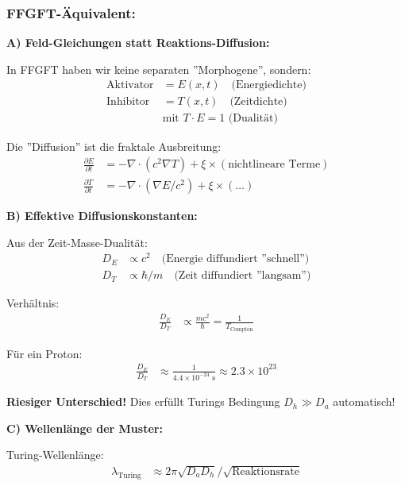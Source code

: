 	\subsubsection*{FFGFT-Äquivalent:}
	
	\textbf{A) Feld-Gleichungen statt Reaktions-Diffusion:}
	
	In FFGFT haben wir keine separaten ''Morphogene'', sondern:
	\begin{align*}
		\text{Aktivator} &= E(x,t) \quad \text{(Energiedichte)} \\
		\text{Inhibitor} &= T(x,t) \quad \text{(Zeitdichte)} \\
		&\text{mit } T \cdot E = 1 \text{ (Dualität)}
	\end{align*}
	
	Die ''Diffusion'' ist die fraktale Ausbreitung:
	\begin{align*}
		\frac{\partial E}{\partial t} &= -\nabla \cdot (c^2 \nabla T) + \xi \times (\text{nichtlineare Terme}) \\
		\frac{\partial T}{\partial t} &= -\nabla \cdot (\nabla E/c^2) + \xi \times (\dots)
	\end{align*}
	
	\textbf{B) Effektive Diffusionskonstanten:}
	
	Aus der Zeit-Masse-Dualität:
	\begin{align*}
		D_E &\propto c^2 \quad \text{(Energie diffundiert ''schnell'')} \\
		D_T &\propto \hbar/m \quad \text{(Zeit diffundiert ''langsam'')}
	\end{align*}
	
	Verhältnis:
	\begin{align*}
		\frac{D_E}{D_T} &\propto \frac{m c^2}{\hbar} = \frac{1}{T_{\text{Compton}}}
	\end{align*}
	
	Für ein Proton:
	\begin{align*}
		\frac{D_E}{D_T} &\approx \frac{1}{4.4 \times 10^{-24} \text{ s}} \approx 2.3 \times 10^{23}
	\end{align*}
	
	\textbf{Riesiger Unterschied!} Dies erfüllt Turings Bedingung $D_h \gg D_a$ automatisch!
	
	\textbf{C) Wellenlänge der Muster:}
	
	Turing-Wellenlänge:
	\begin{align*}
		\lambda_{\text{Turing}} &\approx 2\pi \sqrt{D_a D_h} / \sqrt{\text{Reaktionsrate}}
	\end{align*}
	
